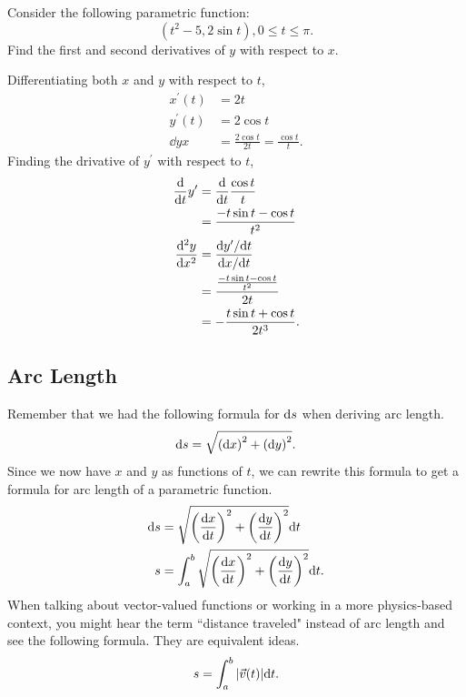 \begin{example}
	Consider the following parametric function:
	\begin{equation*}
		(t^2-5, 2\sin{t}), 0\leq t\leq\pi.
	\end{equation*}
	Find the first and second derivatives of $y$ with respect to $x$.
\end{example}
Differentiating both $x$ and $y$ with respect to $t$,
\begin{align*}
	x^\prime(t) &= 2t \\
	y^\prime(t) &= 2\cos{t} \\
	\dd{y}{x} &= \frac{2\cos{t}}{2t} = \frac{\cos{t}}{t}.
\end{align*}
Finding the drivative of $y^\prime$ with respect to $t$,
\begin{align*}
	\frac{\mathrm{d} }{\mathrm{d} t}y^\prime &= \frac{\mathrm{d} }{\mathrm{d} t}\frac{\cos{t}}{t} \\
	&= \frac{-t\sin{t}-\cos{t}}{t^2} \\
	\frac{\mathrm{d} ^2y}{\mathrm{d} x^2} &= \frac{\mathrm{d} y^\prime/\mathrm{d} t}{\mathrm{d} x/\mathrm{d} t} \\
	&= \frac{\frac{-t\sin{t}-\cos{t}}{t^2}}{2t} \\
	&= -\frac{t\sin{t}+\cos{t}}{2t^3}.
\end{align*}

\subsection{Arc Length}
Remember that we had the following formula for $\mathrm{d} s$ when deriving arc length.
\begin{equation*}
	\mathrm{d} s = \sqrt{\left(\mathrm{d} x\right)^2 + \left(\mathrm{d} y\right)^2}.
\end{equation*}
Since we now have $x$ and $y$ as functions of $t$, we can rewrite this formula to get a formula for arc length of a parametric function.
\begin{align*}
	\mathrm{d} s &= \sqrt{\left(\frac{\mathrm{d} x}{\mathrm{d} t}\right)^2 + \left(\frac{\mathrm{d} y}{\mathrm{d} t}\right)^2}\mathrm{d} t \\
	s &= \int_{a}^{b}{\sqrt{\left(\frac{\mathrm{d} x}{\mathrm{d} t}\right)^2 + \left(\frac{\mathrm{d} y}{\mathrm{d} t}\right)^2}\mathrm{d} t}.
\end{align*}
\noindent
When talking about vector-valued functions or working in a more physics-based context, you might hear the term ``distance traveled" instead of arc length and see the following formula.
They are equivalent ideas.
\begin{equation*}
	s = \int_{a}^{b}{\lvert \vec{v}(t) \rvert\mathrm{d} t}.
\end{equation*}

